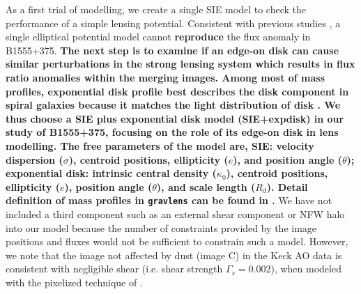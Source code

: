 \documentclass[useAMS,usenatbib]{mnras}
\begin{document}
As a first trial of modelling, we create a single SIE model to check
the performance of a simple lensing potential. Consistent with
previous studies \citep{Marlow99, Xu14}, a single elliptical
potential model cannot \textbf{reproduce} the flux anomaly in B1555+375.
\textbf{The next step is to examine if an edge-on disk can cause similar perturbations in the strong lensing system  which results in flux ratio anomalies within the merging images. Among most of mass profiles, exponential disk profile best describes the disk component in spiral galaxies because it matches the light distribution of disk \citep{Kee98}. We thus choose a SIE plus exponential disk model (SIE+expdisk) in our study of B1555+375, focusing on the role of its edge-on disk in lens modelling. The free parameters of the model are, SIE: velocity dispersion ($\sigma$), centroid positions, ellipticity ($e$), and position angle ($\theta$); exponential disk: intrinsic central density ($\kappa_0$), centroid positions, ellipticity ($e$), position angle ($\theta$), and scale length ($R_d$). Detail definition of mass profiles in {\tt gravlens} can be found in \citet{Kee01}.}
  We have not included a third component such as an external
shear component or NFW halo into our model because the number of constraints provided by the
image positions and fluxes would not be sufficient to constrain such a
model. However, we note that the image not affected by dust (image C)
in the Keck AO data is consistent with negligible shear (i.e. shear
strength $\Gamma_s=0.002$), when modeled with the pixelized technique
of \citet{V09}.
\end{document}
